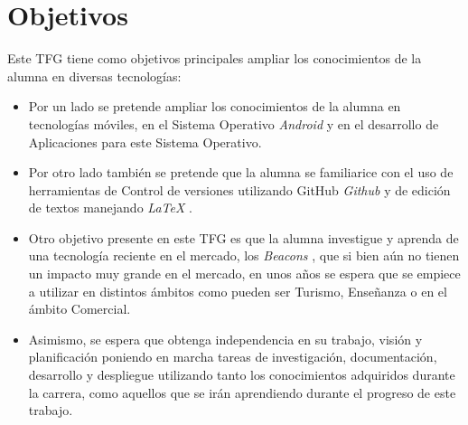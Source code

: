 %
%
%
%


\chapter{Objetivos} \label{chap:objetives}  

Este TFG tiene como objetivos principales ampliar los conocimientos de la alumna en diversas tecnologías:

	
\begin{itemize}
\item  	Por un lado se pretende ampliar los conocimientos de la alumna en tecnologías móviles, en el Sistema Operativo \textit{Android} \cite{URL::Android} y en el desarrollo de Aplicaciones para este Sistema Operativo.
\item Por otro lado también se pretende que la alumna se familiarice con el uso de herramientas de Control de versiones utilizando GitHub \textit{Github} \cite{URL::Github} y de edición de textos manejando \textit{LaTeX}  \cite{URL::LaTeX}.
\item Otro objetivo presente en este TFG es que la alumna investigue y aprenda de una tecnología reciente en el mercado, los \textit{Beacons} \cite{URL::Beacon} , que si bien aún no tienen un impacto muy grande en el mercado, en unos años se espera que se empiece a utilizar en distintos ámbitos como pueden ser Turismo, Enseñanza o en el ámbito Comercial.
\item  Asimismo, se espera que obtenga independencia en su trabajo, visión y planificación poniendo en marcha tareas de investigación, documentación, desarrollo y despliegue utilizando tanto los conocimientos adquiridos durante la carrera, como aquellos que se irán aprendiendo durante el progreso de este trabajo.
\end{itemize}